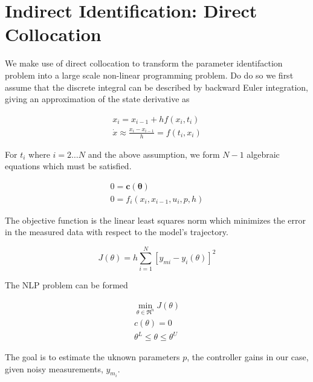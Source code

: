 \documentclass{article}
\begin{document}
\section{Indirect Identification: Direct Collocation}

We make use of direct collocation to transform the parameter identifaction
problem into a large scale non-linear programming problem. Do do so we first
assume that the discrete integral can be described by backward Euler
integration, giving an approximation of the state derivative as

\begin{align}
  x_{i} = x_{i-1} + h f(x_{i}, t_{i}) \\
  \dot{x} \approx \frac{x_i - x_{i-1}}{h} =  f(t_i, x_i)
\end{align}

For $t_i$ where $i=2 \dots N$ and the above assumption, we form $N-1$ algebraic
equations which must be satisfied.

\begin{align}
  0 = \mathbf{c}(\mathbf{\theta}) \\
  0 = f_i(x_{i}, x_{i-1}, u_i, p, h)
\end{align}

The objective function is the linear least squares norm which minimizes the
error in the measured data with respect to the model's trajectory.

\begin{equation}
  J(\theta) = h \sum_{i=1}^N \left[y_{mi} - y_i(\theta)\right]^2
\end{equation}

The NLP problem can be formed

\begin{align}
  \min_{\theta \in \Re^{n}}  J(\theta) \\
  c(\theta) = 0 \\
  \theta^L \leq \theta \leq \theta^U
\end{align}

The goal is to estimate the uknown parameters $p$, the controller gains in our
case, given noisy measurements, $y_{m_i}$.



\end{document}
